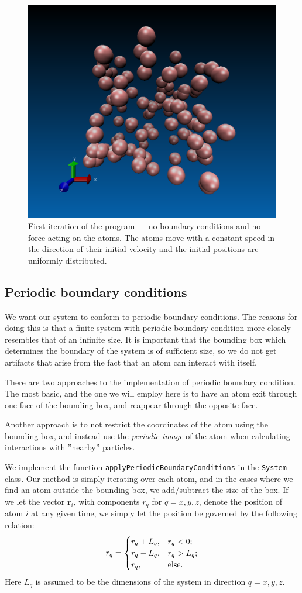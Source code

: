 \documentclass[a4paper]{article}
\renewcommand{\vec}[1]{\mathbf{#1}}
\begin{document}
    \begin{figure}
        \centering \includegraphics[width=0.4\linewidth]{first_iteration.png}
        \caption[Initial state of the program]{First iteration of the program --- no boundary conditions and
            no force acting on the atoms. The atoms move with a constant speed
            in the direction of their initial velocity and the initial
        positions are uniformly distributed.}
        \label{fig:first_iteration}
    \end{figure}

\subsection{Periodic boundary conditions}
\label{sub:periodic_boundary_conditions}
        
    We want our system to conform to periodic boundary conditions. The reasons
    for doing this is that a finite system with periodic boundary condition
    more closely resembles that of an infinite size. It is important that the
    bounding box which determines the boundary of the system is of sufficient
    size, so we do not get artifacts that arise from the fact that an atom can
    interact with itself. 
    
    There are two approaches to the implementation of periodic boundary
    condition. The most basic, and the one we will employ here is to have an
    atom exit through one face of the bounding box, and reappear through the
    opposite face. 

    Another approach is to not restrict the coordinates of the atom using the
    bounding box, and instead use the \emph{periodic image} of the atom when
    calculating interactions with ''nearby'' particles.
    
    We implement the function \texttt{applyPeriodicBoundaryConditions} in the
    \texttt{System}-class.  Our method is simply iterating over each atom, and
    in the cases where we find an atom outside the bounding box, we
    add/subtract the size of the box. If we let the vector $\vec{r}_i$, with
    components $r_q$ for $q = x, y, z$, denote the position of atom $i$ at any
    given time, we simply let the position be governed by the following
    relation:
    \begin{equation}
        \notag
        r_q = \begin{cases}
            r_q + L_q, & r_q < 0; \\
            r_q - L_q, & r_q > L_q; \\
            r_q, & \text{else.}
        \end{cases}
    \end{equation}
    Here $L_q$ is assumed to be the dimensions of the system in direction $q =
    x, y, z$.
    
\end{document}
